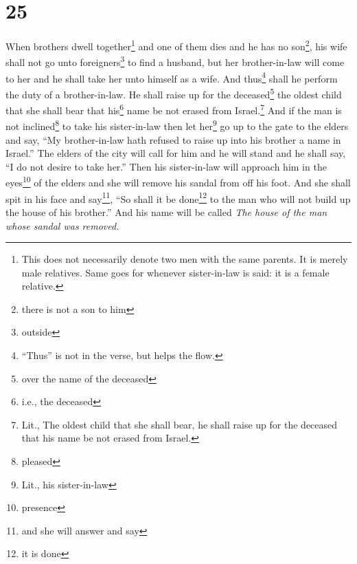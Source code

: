 \section{25}
\begin{enumerate}[align=center]
     When brothers dwell together\footnote{This does not necessarily denote two men with the same parents. It is merely male relatives. Same goes for whenever sister-in-law is said: it is a female relative.} and one of them dies and he has no son\footnote{there is not a son to him}, his wife shall not go unto foreigners\footnote{outside} to find a husband, but her brother-in-law will come to her and he shall take her unto himself as a wife. And thus\footnote{``Thus'' is not in the verse, but helps the flow.} shall he perform the duty of a brother-in-law.%
     He shall raise up for the deceased\footnote{over the name of the deceased} the oldest child that she shall bear that his\footnote{i.e., the deceased} name be not erased from Israel.\footnote{Lit., The oldest child that she shall bear, he shall raise up for the deceased that his name be not erased from Israel.}%
     And if the man is not inclined\footnote{pleased} to take his sister-in-law then let her\footnote{Lit., his sister-in-law} go up to the gate to the elders and say, ``My brother-in-law hath refused to raise up into his brother a name in Israel.''%
     The elders of the city will call for him and he will stand and he shall say, ``I do not desire to take her.''%
     Then his sister-in-law will approach him in the eyes\footnote{presence} of the elders and she will remove his sandal from off his foot. And she shall spit in his face and say\footnote{and she will answer and say}, ``So shall it be done\footnote{it is done} to the man who will not build up the house of his brother.''%
     And his name will be called \emph{The house of the man whose sandal was removed.}%
\end{enumerate}
